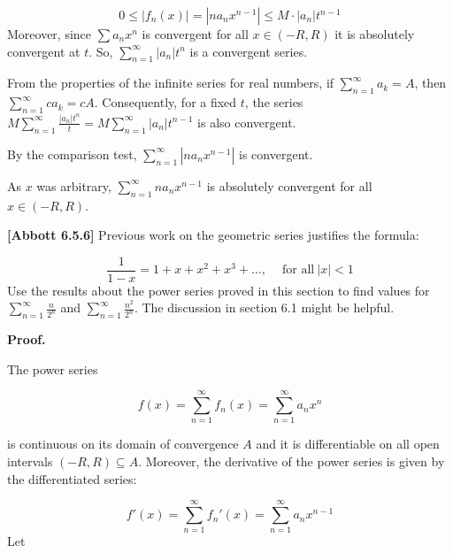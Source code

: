 \documentclass[10pt]{article}
\begin{document}
\begin{equation*}
0\leq |f_{n}( x) |=|na_{n} x^{n-1} |\leq M\cdot |a_{n} |t^{n-1}
\end{equation*}
Moreover, since $\displaystyle \sum a_{n} x^{n}$ is convergent for all $\displaystyle x\in ( -R,R)$ it is absolutely convergent at $\displaystyle t$. So, $\displaystyle \sum _{n=1}^{\infty } |a_{n} |t^{n}$ is a convergent series. 



From the properties of the infinite series for real numbers, if $\displaystyle \sum _{n=1}^{\infty } a_{k} =A$, then $\displaystyle \sum _{n=1}^{\infty } ca_{k} =cA$. Consequently, for a fixed $\displaystyle t$, the series $\displaystyle M\sum _{n=1}^{\infty }\frac{|a_{n} |t^{n}}{t} =M\sum _{n=1}^{\infty } |a_{n} |t^{n-1}$ is also convergent.

By the comparison test, $\displaystyle \sum _{n=1}^{\infty } |na_{n} x^{n-1} |$ is convergent. 

As $\displaystyle x$ was arbitrary, $\displaystyle \sum _{n=1}^{\infty } na_{n} x^{n-1}$ is absolutely convergent for all $\displaystyle x\in ( -R,R)$.



\textbf{[Abbott 6.5.6]} Previous work on the geometric series justifies the formula:




\begin{equation*}
\frac{1}{1-x} =1+x+x^{2} +x^{3} +\dotsc ,\ \quad \text{for all} \ |x|< 1
\end{equation*}
Use the results about the power series proved in this section to find values for $\displaystyle \sum _{n=1}^{\infty }\frac{n}{2^{n}}$ and $\displaystyle \sum _{n=1}^{\infty }\frac{n^{2}}{2^{n}}$. The discussion in section 6.1 might be helpful. 



\textbf{Proof.}



The power series 


\begin{equation*}
f( x) =\sum _{n=1}^{\infty } f_{n}( x) =\sum _{n=1}^{\infty } a_{n} x^{n}
\end{equation*}


is continuous on its domain of convergence $\displaystyle A$ and it is differentiable on all open intervals $\displaystyle ( -R,R) \subseteq A$. Moreover, the derivative of the power series is given by the differentiated series:


\begin{equation*}
f'( x) =\sum _{n=1}^{\infty } f_{n} '( x) =\sum _{n=1}^{\infty } a_{n} x^{n-1}
\end{equation*}
Let 
\end{document}
